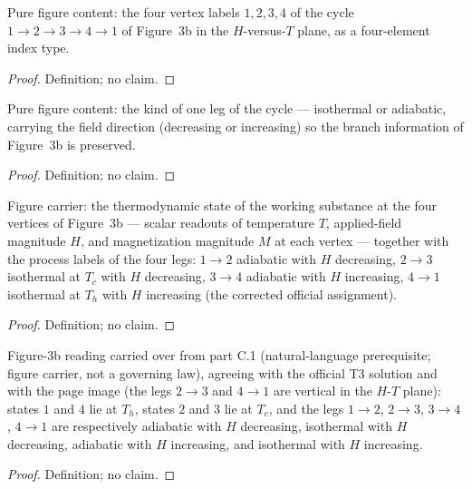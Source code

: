\begin{definition}
\label{def:IPhO2026Problems_problem_IPhO_2026_3_C_2:Vertex}
Pure figure content: the four vertex labels $1, 2, 3, 4$ of the cycle
$1 \to 2 \to 3 \to 4 \to 1$ of Figure~3b in the $H$-versus-$T$ plane,
as a four-element index type.
\end{definition}
\begin{proof}
Definition; no claim.
\end{proof}

\begin{definition}
\label{def:IPhO2026Problems_problem_IPhO_2026_3_C_2:ProcessKind}
Pure figure content: the kind of one leg of the cycle --- isothermal
or adiabatic, carrying the field direction (decreasing or increasing)
so the branch information of Figure~3b is preserved.
\end{definition}
\begin{proof}
Definition; no claim.
\end{proof}

\begin{definition}
\label{def:IPhO2026Problems_problem_IPhO_2026_3_C_2:CarnotCycle}
Figure carrier: the thermodynamic state of the working substance at
the four vertices of Figure~3b --- scalar readouts of temperature
$T$, applied-field magnitude $H$, and magnetization magnitude $M$ at
each vertex --- together with the process labels of the four legs:
$1\to2$ adiabatic with $H$ decreasing, $2\to3$ isothermal at $T_c$
with $H$ decreasing, $3\to4$ adiabatic with $H$ increasing, $4\to1$
isothermal at $T_h$ with $H$ increasing (the corrected official
assignment).
\end{definition}
\begin{proof}
Definition; no claim.
\end{proof}

\begin{definition}
\label{def:IPhO2026Problems_problem_IPhO_2026_3_C_2:Figure3bAssignment}
Figure-3b reading carried over from part C.1 (natural-language
prerequisite; figure carrier, not a governing law), agreeing with the
official T3 solution and with the page image (the legs $2\to3$ and
$4\to1$ are vertical in the $H$-$T$ plane): states $1$ and $4$ lie at
$T_h$, states $2$ and $3$ lie at $T_c$, and the legs $1\to2$, $2\to3$,
$3\to4$, $4\to1$ are respectively adiabatic with $H$ decreasing,
isothermal with $H$ decreasing, adiabatic with $H$ increasing, and
isothermal with $H$ increasing.
\end{definition}
\begin{proof}
Definition; no claim.
\end{proof}

